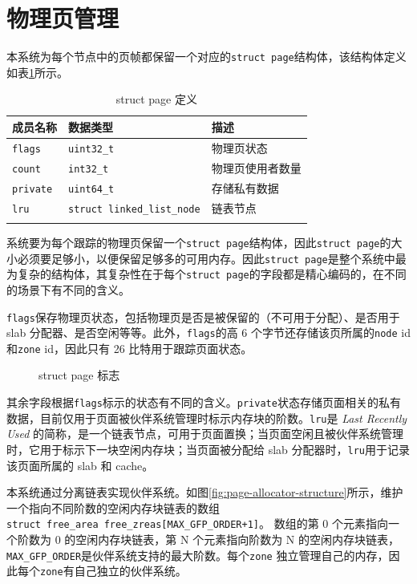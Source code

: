 \documentclass[AutoFakeBold]{LZUThesis}
\begin{document}
\begin{sloppypar}
\section{物理页管理}

本系统为每个节点中的页帧都保留一个对应的\texttt{struct\ page}结构体，该结构体定义如表\ref{table:struct-page-definition}所示。

\begin{longtable}[]{@{}lll@{}}
\toprule\noalign{}
成员名称 & 数据类型 & 描述 \\
\midrule\noalign{}
\endhead
\bottomrule\noalign{}
\endlastfoot
\texttt{flags} & \texttt{uint32\_t} & 物理页状态 \\
\texttt{count} & \texttt{int32\_t} & 物理页使用者数量 \\
\texttt{private} & \texttt{uint64\_t} & 存储私有数据 \\
\texttt{lru} & \texttt{struct\ linked\_list\_node} & 链表节点 \\
\caption{struct page 定义}
\label{table:struct-page-definition}
\end{longtable}

系统要为每个跟踪的物理页保留一个\texttt{struct\ page}结构体，因此\texttt{struct\ page}的大小必须要足够小，以便保留足够多的可用内存。因此\texttt{struct\ page}是整个系统中最为复杂的结构体，其复杂性在于每个\texttt{struct\ page}的字段都是精心编码的，在不同的场景下有不同的含义。

\texttt{flags}保存物理页状态，包括物理页是否是被保留的（不可用于分配）、是否用于
slab 分配器、是否空闲等等。此外，\texttt{flags}的高 6
个字节还存储该页所属的\texttt{node} id 和\texttt{zone} id，因此只有 26
比特用于跟踪页面状态。

\begin{figure}
\centering

\caption{struct page 标志}
\end{figure}

其余字段根据\texttt{flags}标示的状态有不同的含义。\texttt{private}状态存储页面相关的私有数据，目前仅用于页面被伙伴系统管理时标示内存块的阶数。\texttt{lru}是
\emph{Last Recently Used}
的简称，是一个链表节点，可用于页面置换；当页面空闲且被伙伴系统管理时，它用于标示下一块空闲内存块；当页面被分配给
slab 分配器时，\texttt{lru}用于记录该页面所属的 slab 和 cache。

本系统通过分离链表实现伙伴系统。如图\ref{fig:page-allocator-structure}所示，维护一个指向不同阶数的空闲内存块链表的数组\texttt{struct\ free\_area\ free\_zreas{[}MAX\_GFP\_ORDER+1{]}}。
数组的第 0 个元素指向一个阶数为 0 的空闲内存块链表，第 N
个元素指向阶数为 N
的空闲内存块链表，\texttt{MAX\_GFP\_ORDER}是伙伴系统支持的最大阶数。每个\texttt{zone}
独立管理自己的内存，因此每个\texttt{zone}有自己独立的伙伴系统。


\end{sloppypar}
\end{document}
